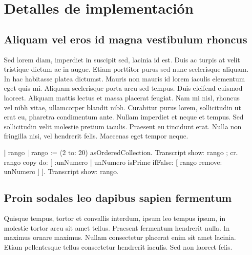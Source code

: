 \documentclass[../informe.tex]{subfiles}
\begin{document}
\section{Detalles de implementación}\label{sec:implementacion}

\subsection{Aliquam vel eros id magna vestibulum rhoncus}
Sed lorem diam, imperdiet in suscipit sed, lacinia id est. Duis ac turpis at velit tristique dictum ac in augue. Etiam porttitor purus sed nunc scelerisque aliquam. In hac habitasse platea dictumst. Mauris non mauris id lorem iaculis elementum eget quis mi. Aliquam scelerisque porta arcu sed tempus. Duis eleifend euismod laoreet. Aliquam mattis lectus et massa placerat feugiat. Nam mi nisl, rhoncus vel nibh vitae, ullamcorper blandit nibh. Curabitur purus lorem, sollicitudin ut erat eu, pharetra condimentum ante. Nullam imperdiet et neque et tempus. Sed sollicitudin velit molestie pretium iaculis. Praesent eu tincidunt erat. Nulla non fringilla nisi, vel hendrerit felis. Maecenas eget tempor neque.

\begin{alternate}[breaklines=true,numbers=left,xleftmargin=5mm]
| rango |
rango := (2 to: 20) asOrderedCollection.
Transcript show: rango ; cr.
rango copy do: [ :unNumero | unNumero isPrime ifFalse: [ rango remove: unNumero ] ].
Transcript show: rango.
\end{alternate}

\subsection{Proin sodales leo dapibus sapien fermentum}
Quisque tempus, tortor et convallis interdum, ipsum leo tempus ipsum, in molestie tortor arcu sit amet tellus. Praesent fermentum hendrerit nulla. In maximus ornare maximus. Nullam consectetur placerat enim sit amet lacinia. Etiam pellentesque tellus consectetur hendrerit iaculis. Sed non laoreet felis.


\end{document}
